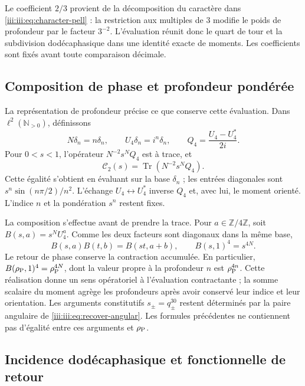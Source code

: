 Le coefficient $2/3$ provient de la décomposition du caractère dans
\eqref{iii:iii:eq:character-pell} : la restriction aux multiples de $3$
modifie le poids de profondeur par le facteur $3^{-2}$. L’évaluation
réunit donc le quart de tour et la subdivision dodécaphasique dans une
identité exacte de moments. Les coefficients sont fixés avant toute
comparaison décimale.

\subsection{Composition de phase et profondeur pondérée}

La représentation de profondeur précise ce que conserve cette évaluation.
Dans $\ell^2(\mathbb N_{>0})$, définissons
\[
 N\delta_n=n\delta_n,\qquad U_4\delta_n=i^n\delta_n,
 \qquad Q_4=\frac{U_4-U_4^*}{2i}.
\]
Pour $0<s<1$, l’opérateur $N^{-2}s^NQ_4$ est à trace, et
\begin{equation}
 \mathcal C_2(s)=\operatorname{Tr}(N^{-2}s^NQ_4).
 \label{iii:iii:eq:pell-depth-trace}
\end{equation}
Cette égalité s’obtient en évaluant sur la base $\delta_n$ ; les
entrées diagonales sont $s^n\sin(n\pi/2)/n^2$. L’échange
$U_4\leftrightarrow U_4^*$ inverse $Q_4$ et, avec lui, le moment
orienté. L’indice $n$ et la pondération $s^n$ restent fixes.

La composition s’effectue avant de prendre la trace. Pour
$a\in\mathbb Z/4\mathbb Z$, soit $B(s,a)=s^NU_4^a$. Comme les deux
facteurs sont diagonaux dans la même base,
\begin{equation}
 B(s,a)B(t,b)=B(st,a+b),\qquad
 B(s,1)^4=s^{4N}.
 \label{iii:iii:eq:pell-depth-composition}
\end{equation}
Le retour de phase conserve la contraction accumulée. En particulier,
$B(\rho_{\rm P},1)^4=\rho_{\rm P}^{4N}$, dont la valeur propre à la profondeur
$n$ est $\rho_{\rm P}^{4n}$. Cette réalisation donne un sens
opératoriel à l’évaluation contractante ; la somme scalaire du moment
agrège les profondeurs après avoir conservé leur indice et leur orientation.
Les arguments constitutifs $s_\pm=q_\pm^{30}$ restent déterminés par
la paire angulaire de \eqref{iii:iii:eq:recover-angular}. Les formules précédentes
ne contiennent pas d’égalité entre ces arguments et $\rho_{\rm P}$.

\subsection{Incidence dodécaphasique et fonctionnelle de retour}

